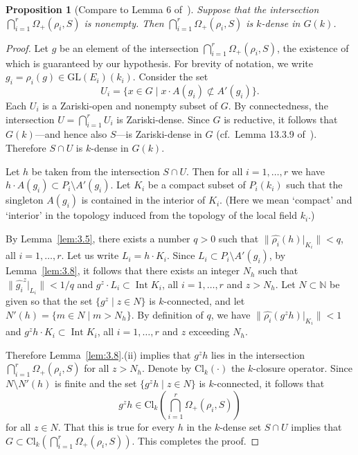 \documentclass{amsart}
\theoremstyle{plain}
\newtheorem{proposition}[theorem]{Proposition}
\theoremstyle{definition}
\theoremstyle{remark}
\DeclareMathOperator{\Int}{Int}
\providecommand{\norm}[1]{\lVert#1\rVert}
\begin{document}
\begin{proposition}[Compare to Lemma 6 of~\cite{MR613853}]\label{prop:dense}
Suppose that the intersection $\bigcap_{i = 1}^{r} \Omega_{+}(\rho_{i}, S)$ is nonempty.
Then $\bigcap_{i = 1}^{r} \Omega_{+}(\rho_{i}, S)$ is $k$-dense in $G(k)$.
\end{proposition}
\begin{proof}
Let $g$ be an element of the intersection $\bigcap_{i = 1}^{r}\Omega_{+}(\rho_{i}, S)$,
the existence of which
is guaranteed by our
hypothesis. For brevity of notation, we write $g_{i} = \rho_{i}(g) \in
\mathrm{GL}(E_{i})(k_{i})$.
Consider the set $$
U_{i} =
\{x
\in G \mid x\cdot A(g_{i})
\not\subset A'(g_{i})\}.$$
Each $U_{i}$ is a Zariski-open and nonempty subset of $G$.
By connectedness, the intersection
$U = \bigcap_{i=1}^{r} U_{i}$ is Zariski-dense. Since $G$ is reductive, it follows that
$G(k)$---and 
hence also $S$---is Zariski-dense in $G$ (cf.\ Lemma 13.3.9 of~\cite{MR1642713}).
Therefore $S \cap U$ is $k$-dense in $G(k)$.

 Let $h$ be taken from the intersection $S \cap U$. Then for all $i = 1,\ldots, r$ we have
$h\cdot A(g_{i})
\subset P_{i} \setminus A'(g_{i})$. Let $K_{i}$ be a compact subset of $P_{i}(k_{i})$ such
that the singleton $A(g_{i})$ is contained in the interior of $K_{i}$.
(Here we mean `compact' and `interior' in the topology induced from the topology of the
local field $k_{i}$.)

By Lemma~\ref{lem:3.5}, there exists a number $q > 0$ such that $\norm{
\widehat{\rho_{i}}(h)|_{K_{i}}} < q$, all $i = 1,\ldots, r$. Let us write $L_{i} = h\cdot
K_{i}$. Since $L_{i} \subset P_{i} \setminus A'(g_{i})$, by Lemma~\ref{lem:3.8}, it
follows
that there exists an integer $N_{h}$ such that $\norm{\widehat{g_{i}}^{z}|_{L_{i}}} <
1/q$ and $g^{z}\cdot L_{i} \subset \Int K_{i}$, all $i = 1,\ldots, r$ and $z
> N_{h}$. Let $N \subset \mathbb{N}$ be given so that the set $\{g^{z} \mid z \in N\}$
is $k$-connected, and let $N'(h) = \{m \in N \mid m > N_{h}\}$. By
definition of $q$, we have $\norm{\widehat{\rho_{i}}(g^{z}h)|_{K_{i}}} < 1$ and
$g^{z}h \cdot K_{i} \subset \Int K_{i}$, all
$i = 1,\ldots, r$ and $z$ exceeding $N_{h}$.

Therefore Lemma~\ref{lem:3.8}.(ii) implies that $g^{z}h$ lies in
the intersection $\bigcap_{i = 1}^{r} \Omega_{+}(\rho_{i}, S)$ for all $z > N_{h}$.
Denote by $\mathrm{Cl}_{k}(\cdot)$ the $k$-closure operator. 
Since $N\setminus N'(h)$ is finite and the set $\{g^{z}h \mid z \in N\}$
is $k$-connected, it follows that $$g^{z}h \in \mathrm{Cl}_{k}\left(\bigcap_{i = 1}^{r}
\Omega_{+}(\rho_{i}, S)\right)$$
for all $z \in N$. That this is true for every $h$
in the $k$-dense set $S \cap U$ implies that $G \subset \mathrm{Cl}_{k}(\bigcap_{i = 1}^{r} \Omega_{+}(\rho_{i},
S))$. This completes the proof.
\end{proof}
\end{document}
